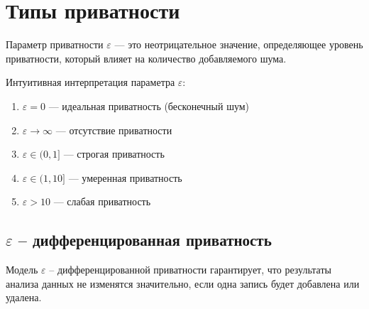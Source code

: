 



\newpage
\section{Типы приватности}

Параметр приватности $\varepsilon$ --- это неотрицательное значение, определяющее уровень приватности, который влияет на количество добавляемого шума.~\cite{hu2015differential}

Интуитивная интерпретация параметра $\varepsilon$:
\begin{enumerate}[label*=---]
	\item $\varepsilon = 0$ --- идеальная приватность (бесконечный шум)
	\item $\varepsilon \to \infty$ --- отсутствие приватности
	\item $\varepsilon \in (0, 1]$ --- строгая приватность
	\item $\varepsilon \in (1, 10]$ --- умеренная приватность
	\item $\varepsilon > 10$ --- слабая приватность
\end{enumerate}


\subsection{$\varepsilon$ -- дифференцированная приватность}

Модель $\varepsilon$ -- дифференцированной приватности гарантирует, что результаты анализа данных не изменятся значительно, если одна запись будет добавлена или удалена.~\cite{hu2015differential}

